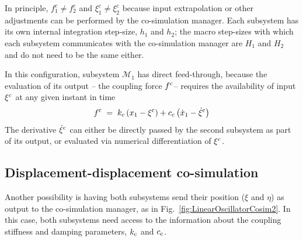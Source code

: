 \documentclass[fleqn,11pt]{article}
\newcommand{\plbr}[1]		{ \left( #1 \right) }
\newcommand{\eq}			{ \; = \; }
\newcommand{\timestep}		{ {h} }
\begin{document}
In principle, $f_1^c \neq f_2^c$ and $\xi_1^c \neq \xi_2^c$ because input extrapolation or other adjustments can be performed by the co-simulation manager.
Each subsystem has its own internal integration step-size, $\timestep_1$ and $\timestep_2$; the macro step-sizes with which each subsystem communicates with the co-simulation manager are $H_1$ and $H_2$ and do not need to be the same either.

In this configuration, subsystem $\mathcal{M}_1$ has direct feed-through, because the evaluation of its output -- the coupling force $f^{\rm c}$-- requires the availability of input $\xi^{\rm c}$ at any given instant in time
\begin{equation}
	f^{\rm c} \eq k_{\rm c} \plbr{x_1 - \xi^{\rm c}} + c_{\rm c} \plbr{\dot{x}_1 - \dot{\xi}^{\rm c}}
\end{equation}
The derivative $\dot{\xi}^{\rm c}$ can either be directly passed by the second subsystem as part of its output, or evaluated via numerical differentiation of $\xi^{\rm c}$.

\subsection{Displacement-displacement co-simulation}
\label{DisplacementDisplacement}

Another possibility is having both subsystems send their position ($\xi$ and $\eta$) as output to the co-simulation manager, as in Fig.~\ref{fig:LinearOscillatorCosim2}.
In this case, both subsystems need access to the information about the coupling stiffness and damping parameters, $k_{\rm c}$ and $c_{\rm c}$.
\end{document}

